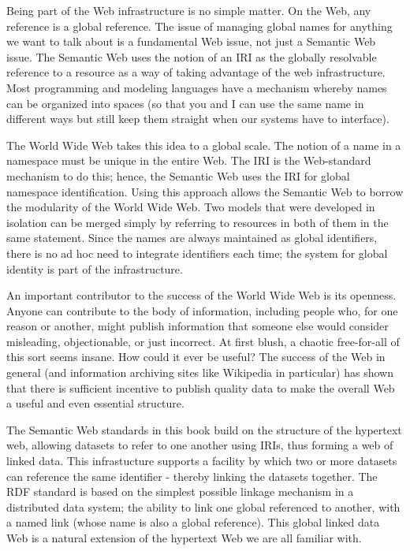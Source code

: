 Being part of the Web infrastructure is no simple matter. On the Web,
any reference is a global reference. The issue of managing global names
for anything we want to talk about is a fundamental Web issue, not just
a Semantic Web issue. The Semantic Web uses the notion of an IRI as the
globally resolvable reference to a resource as a way of taking advantage
of the web infrastructure. Most programming and modeling languages have
a mechanism whereby names can be organized into spaces (so that you and
I can use the same name in different ways but still keep them straight
when our systems have to interface). 

The World Wide Web takes this idea to a global scale.  The notion of a name in a namespace must be
unique  in the entire Web.
The IRI is the Web-standard mechanism to do this; hence, the Semantic
Web uses the IRI for global namespace identification. Using this
approach allows the Semantic Web to borrow the modularity of the World
Wide Web. Two models that were developed in isolation can be merged
simply by referring to resources in both of them in the same statement.
Since the names are always maintained as global identifiers, there is no
ad hoc need to integrate identifiers each time; the system for global
identity is part of the infrastructure.

An important contributor to the success of the World Wide Web is its
openness. Anyone can contribute to the body of information, including
people who, for one reason or another, might publish information that
someone else would consider misleading, objectionable, or just
incorrect. At first blush, a chaotic free-for-all of this sort seems
insane. How could it ever be useful? The success of the Web in general
(and information archiving sites like Wikipedia in particular) has shown
that there is sufficient incentive to publish quality data to make the
overall Web a useful and even essential structure.

The Semantic Web standards in this book build on the structure of the 
hypertext web, allowing datasets to refer to one another using IRIs, thus 
forming a web of linked data.  This infrastucture supports a facility by which 
two or more datasets can reference the same identifier - thereby linking
the datasets together.  The RDF standard is based on the simplest possible 
linkage mechanism in a distributed data system; the ability to link 
one global referenced to another, with a named link (whose name is also a global reference). 
This global linked data Web is a natural extension of the hypertext Web 
we are all familiar with. 

